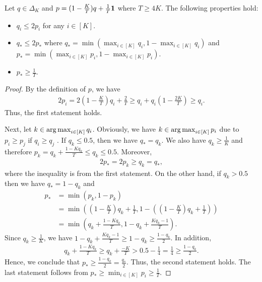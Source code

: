 \begin{lemma}
    Let $q \in \Delta_K$ and $p = (1-\frac{K}{T})q + \frac{1}{T}\bm{1}$ where $T \geq 4K$. The following properties hold:
    \begin{itemize}
        \item $q_{i} \leq 2p_{i}$ for any $i \in [K]$.
        \item $q_{*} \leq 2p_{*}$ where $q_* = \min(\max_{i \in [K]}q_i, 1 - \max_{i \in [K]}q_i)$ and $p_* = \min(\max_{i \in [K]}p_i, 1 - \max_{i \in [K]}p_i)$.
        \item $p_* \geq \frac{1}{T}$.
    \end{itemize}
    \label{lemma:2pstarlargerthanqstar}
\end{lemma}
\begin{proof}
    By the definition of $p$, we have
    \begin{align*}
        2p_{i} = 2(1 - \frac{K}{T})q_i + \frac{2}{T} \geq q_i + q_i(1 - \frac{2K}{T}) \geq q_i.
    \end{align*}
    Thus, the first statement holds. 
    
    Next, let $k \in \operatorname*{arg\,max}_{i \in [K]}q_i$. Obviously, we have $k \in \operatorname*{arg\,max}_{i \in [K]}p_i$  due to $p_i \geq p_j$ if $q_i \geq q_j$ . If $q_{k} \leq 0.5$, then we have $q_* = q_{k}$. We also have $q_{k} \geq \frac{1}{K}$ and therefore $p_{k} = q_{k} + \frac{1 - Kq_{k}}{T} \leq  q_{k} \leq 0.5$. Moreover, 
    \begin{align*}
        2p_* = 2p_{k} \geq q_{k} = q_*,
    \end{align*}
    where the inequality is from the first statement. On the other hand, if $q_{k} > 0.5$ then we have $q_* = 1 - q_k$ and
    \begin{align*}
        p_* &= \min(p_k, 1 - p_k) \\
        &= \min\left((1-\frac{K}{T})q_k + \frac{1}{T}, 1 - \left((1-\frac{K}{T})q_k + \frac{1}{T}\right)\right) \\
        &= \min\left(q_k + \frac{1-Kq_k}{T}, 1 - q_k + \frac{Kq_k - 1}{T} \right).
    \end{align*}
    Since $q_k \geq \frac{1}{K}$, we have $1 - q_k + \frac{Kq_k - 1}{T} \geq 1 - q_k \geq \frac{1-q_k}{2}$. In addition, 
    \begin{align*}
        q_k + \frac{1-Kq_k}{T} \geq q_k + \frac{-K}{T} > 0.5 - \frac{1}{4} = \frac{1}{4} \geq \frac{1-q_k}{2}.
    \end{align*}
    Hence, we conclude that $p_* \geq \frac{1-q_k}{2} = \frac{q_*}{2}$. Thus, the second statement holds. The last statement follows from $p_* \geq \min_{i \in [K]}p_i \geq \frac{1}{T}$.
\end{proof}
